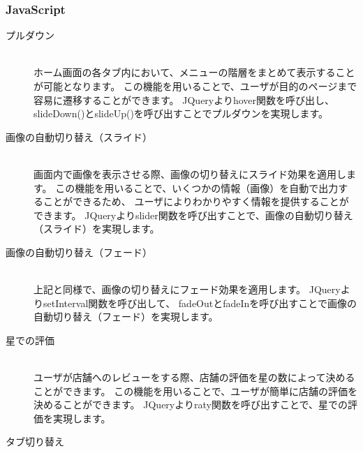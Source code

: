 \documentclass[a4j,titlepage]{jarticle}
\begin{document}
\subsubsection{JavaScript}
\begin{description}
\item [プルダウン]~\\
ホーム画面の各タブ内において、メニューの階層をまとめて表示することが可能となります。
この機能を用いることで、ユーザが目的のページまで容易に遷移することができます。
JQueryよりhover関数を呼び出し、slideDown()とslideUp()を呼び出すことでプルダウンを実現します。

\item [画像の自動切り替え（スライド）]~\\
画面内で画像を表示させる際、画像の切り替えにスライド効果を適用します。
この機能を用いることで、いくつかの情報（画像）を自動で出力することができるため、
ユーザによりわかりやすく情報を提供することができます。
JQueryよりslider関数を呼び出すことで、画像の自動切り替え（スライド）を実現します。

\item[画像の自動切り替え（フェード）]~\\
上記と同様で、画像の切り替えにフェード効果を適用します。
JQueryよりsetInterval関数を呼び出して、
fadeOutとfadeInを呼び出すことで画像の自動切り替え（フェード）を実現します。

\item[星での評価]~\\
ユーザが店舗へのレビューをする際、店舗の評価を星の数によって決めることができます。
この機能を用いることで、ユーザが簡単に店舗の評価を決めることができます。
JQueryよりraty関数を呼び出すことで、星での評価を実現します。

\item[タブ切り替え]~\\
\end{description}
\end{document}
